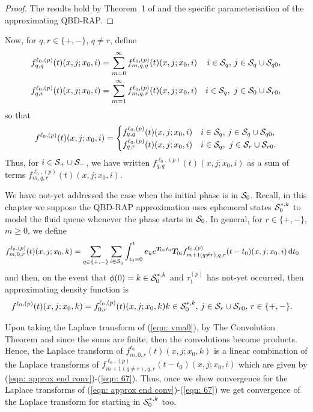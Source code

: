 \begin{proof}
	The results hold by Theorem~1 of \cite{bn2010} and the specific parameterisation of the approximating QBD-RAP.
\end{proof}  

Now, for \(q,r\in\{+,-\},\, q\neq r\), define  
\begin{align*}
	f^{\ell_0,(p)}_{q,q}(t)(x,j;x_0,i)  &= \sum_{m=0}^\infty f^{\ell_0,(p)}_{m,q,q}(t)(x,j;x_0,i)  & i\in\mathcal{S}_q,\,j\in\mathcal{S}_q\cup\mathcal{S}_{q0},
	\\ f^{\ell_0,(p)}_{q,r}(t)(x,j;x_0,i)  &= \sum_{m=1}^\infty f^{\ell_0,(p)}_{m,q,r}(t)(x,j;x_0,i)  & i\in\mathcal S_q,\,\,j\in\mathcal S_{0}\cup\mathcal{S}_{r0},
\end{align*}
so that 
\begin{align}
	f^{\ell_0,(p)}(t)(x,j;x_0,i)  = \begin{cases}
		 f^{\ell_0,(p)}_{q,q}(t)(x,j;x_0,i)  & i\in\mathcal{S}_q,\,j\in\mathcal{S}_q\cup\mathcal{S}_{q0},
	\\    f^{\ell_0,(p)}_{q,r}(t)(x,j;x_0,i)  & i\in\mathcal S_q,\,\,j\in\mathcal S_{r}\cup\mathcal{S}_{r0}.
	\end{cases}\label{eqn:ghghghghggg}
\end{align}
Thus, for \(i\in\mathcal{S}_+\cup\mathcal{S}_-\), we have written \(f^{\ell_0,(p)}_{q,q}(t)(x,j;x_0,i)\) as a sum of terms \(f^{\ell_0,(p)}_{m,q,r}(t)(x,j;x_0,i)\).

We have not-yet addressed the case when the initial phase is in \(\mathcal{S}_0\). Recall, in this chapter we suppose the QBD-RAP approximation uses ephemeral states \(\mathcal{S}_0^{*,k}\) to model the fluid queue whenever the phase starts in \(\mathcal{S}_0\). In general, for \(r\in\{+,-\}\), \(m\geq 0\), we define
\begin{align}
	f_{m,0,r}^{\ell_0,(p)}(t)(x,j;x_0,k)  
	&= \sum_{q\in\{+,-\}}\sum_{i\in\mathcal{S}_q}\int_{t_0=0}^t \boldsymbol e_ke^{\boldsymbol T_{00}t_0} \boldsymbol T_{0i} f_{m+1(q\neq r),q,r}^{\ell_0,(p)}(t-t_0)(x,j;x_0,i)\, \mathrm{d} t_0 \label{eqn: vma0}
\end{align}
and then, on the event that \(\phi(0)=k\in\mathcal{S}_0^{*,k}\) and \(\tau_1^{(p)}\) has not-yet occurred, then approximating density function is
\begin{align}
	f^{\ell_0,(p)}(t)(x,j;x_0,k)  =
		 f^{\ell_0,(p)}_{0,r}(t)(x,j;x_0,k)  & k\in\mathcal{S}_0^{*,k},\,j\in\mathcal{S}_r\cup\mathcal{S}_{r0},\,r\in\{+,-\}.
\end{align}

Upon taking the Laplace transform of (\ref{eqn: vma0}), by The Convolution Theorem and since the sums are finite, then the convolutions become products. Hence, the Laplace transform of \(f_{m,0,r}^{\ell_0}(t)(x,j;x_0,k)\) is a linear combination of the Laplace transforms of \(f_{m+1(q\neq r),q,r}^{\ell_0,(p)}(t-t_0)(x,j;x_0,i)\) which are given by (\ref{eqn: approx end conv})-(\ref{eqn: 67}). Thus, once we show convergence for the Laplace transforms of (\ref{eqn: approx end conv})-(\ref{eqn: 67}) we get convergence of the Laplace transform for starting in \(\mathcal{S}_0^{*,k}\) too. 

